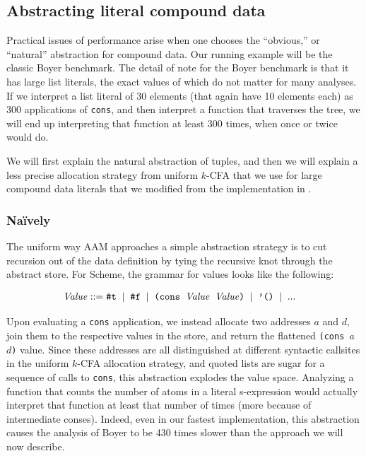 \documentclass[preprint,onecolumn,9pt]{sigplanconf} %
\newcommand{\Naively}{Na\"ively}
\begin{document}
\subsection{Abstracting literal compound data}

Practical issues of performance arise when one chooses the
``obvious,'' or ``natural'' abstraction for compound data. Our running
example will be the classic Boyer benchmark. The detail of note for
the Boyer benchmark is that it has large list literals, the exact
values of which do not matter for many analyses. If we
interpret a list literal of 30 elements (that again have 10 elements
each) as 300 applications of {\tt cons}, and then interpret a function
that traverses the tree, we will end up interpreting that function at
least 300 times, when once or twice would do.

We will first explain the natural abstraction of tuples, and then we
will explain a less precise allocation strategy from uniform $k$-CFA
that we use for large compound data literals that we modified from the
implementation in \citep{dvanhorn:wright-jagannathan-toplas98}.

\subsubsection{\Naively}

The uniform way AAM approaches a simple abstraction strategy is to cut
recursion out of the data definition by tying the recursive knot
through the abstract store. For Scheme, the grammar for values looks
like the following:

\newcommand{\alt}{\;\mid\;}
\begin{align*}
\Value &::= \mbox{{\tt \#t}} \alt \mbox{{\tt \#f}} \alt \mbox{{\tt(cons $\Value$ $\Value$)}} \alt \mbox{{\tt '()}} \alt ...
\end{align*}

Upon evaluating a {\tt cons} application, we instead allocate two
addresses $a$ and $d$, join them to the respective values in the
store, and return the flattened {\tt (cons $a$ $d$)} value. Since
these addresses are all distinguished at different syntactic callsites
in the uniform $k$-CFA allocation strategy, and quoted lists are sugar
for a sequence of calls to {\tt cons}, this abstraction explodes the
value space. Analyzing a function that counts the number of atoms in a
literal s-expression would actually interpret that function at least
that number of times (more because of intermediate conses). Indeed,
even in our fastest implementation, this abstraction causes the
analysis of Boyer to be 430 times slower than the approach we will now
describe.
\end{document}

